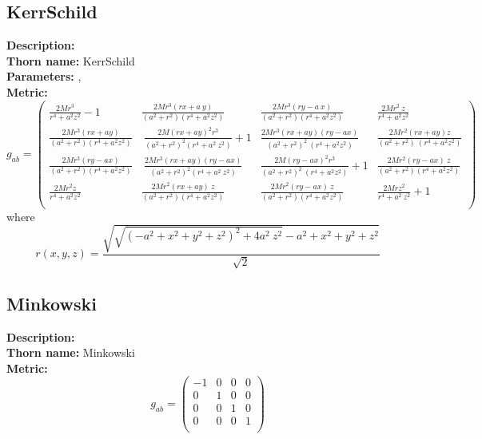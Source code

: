 \subsection{KerrSchild}
{\bf Description:}   \\
{\bf Thorn name:} KerrSchild \\
{\bf Parameters:} ,  \\
{\bf Metric:} \\
\begin{equation}
g_{ab} =
\left(
\begin{array}{cccc}
 \frac{2 M r^3}{r^4+a^2 z^2}-1 & \frac{2 M r^3 (r x+a \
y)}{\left(a^2+r^2\right) \left(r^4+a^2 z^2\right)} & \frac{2 M r^3 (r y-a \
x)}{\left(a^2+r^2\right) \left(r^4+a^2 z^2\right)} & \frac{2 M r^2 \
z}{r^4+a^2 z^2} \\
 \frac{2 M r^3 (r x+a y)}{\left(a^2+r^2\right) \left(r^4+a^2 z^2\right)} & \
\frac{2 M (r x+a y)^2 r^3}{\left(a^2+r^2\right)^2 \left(r^4+a^2 \
z^2\right)}+1 & \frac{2 M r^3 (r x+a y) (r y-a x)}{\left(a^2+r^2\right)^2 \
\left(r^4+a^2 z^2\right)} & \frac{2 M r^2 (r x+a y) z}{\left(a^2+r^2\right) \
\left(r^4+a^2 z^2\right)} \\
 \frac{2 M r^3 (r y-a x)}{\left(a^2+r^2\right) \left(r^4+a^2 z^2\right)} & \
\frac{2 M r^3 (r x+a y) (r y-a x)}{\left(a^2+r^2\right)^2 \left(r^4+a^2 \
z^2\right)} & \frac{2 M (r y-a x)^2 r^3}{\left(a^2+r^2\right)^2 \
\left(r^4+a^2 z^2\right)}+1 & \frac{2 M r^2 (r y-a x) \
z}{\left(a^2+r^2\right) \left(r^4+a^2 z^2\right)} \\
 \frac{2 M r^2 z}{r^4+a^2 z^2} & \frac{2 M r^2 (r x+a y) \
z}{\left(a^2+r^2\right) \left(r^4+a^2 z^2\right)} & \frac{2 M r^2 (r y-a x) \
z}{\left(a^2+r^2\right) \left(r^4+a^2 z^2\right)} & \frac{2 M r z^2}{r^4+a^2 \
z^2}+1 \\
\end{array}
\right)
\end{equation}
where
\begin{equation}
r(x,y,z)=\frac{\sqrt{\sqrt{\left(-a^2+x^2+y^2+z^2\right)^2+4 a^2 \
z^2}-a^2+x^2+y^2+z^2}}{\sqrt{2}}
\end{equation}


\subsection{Minkowski}
{\bf Description:}   \\
{\bf Thorn name:} Minkowski \\
{\bf Metric:} \\
\begin{equation}
g_{ab} =
\left(
\begin{array}{cccc}
 -1 & 0 & 0 & 0 \\
 0 & 1 & 0 & 0 \\
 0 & 0 & 1 & 0 \\
 0 & 0 & 0 & 1 \\
\end{array}
\right)
\end{equation}


